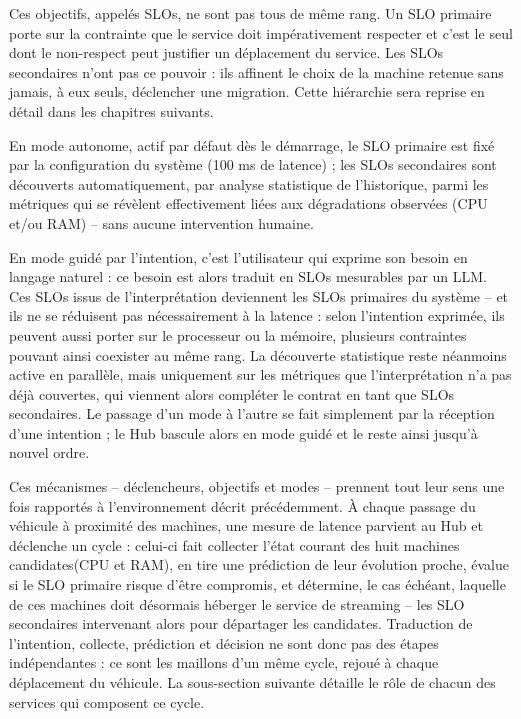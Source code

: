 Ces objectifs, appelés SLOs, ne sont pas tous de même rang. Un SLO primaire porte sur la contrainte que le service doit impérativement respecter et c'est le seul dont le non-respect peut justifier un déplacement du service. Les SLOs secondaires n'ont pas ce pouvoir : ils affinent le choix de la machine retenue sans jamais, à eux seuls, déclencher une migration. Cette hiérarchie sera reprise en détail dans les chapitres suivants.

En mode autonome, actif par défaut dès le démarrage, le SLO primaire est fixé par la configuration du système (100 ms de latence) ; les SLOs secondaires sont découverts automatiquement, par analyse statistique de l'historique, parmi les métriques qui se révèlent effectivement liées aux dégradations observées (CPU et/ou RAM) -- sans aucune intervention humaine.

En mode guidé par l'intention, c'est l'utilisateur qui exprime son besoin en langage naturel : ce besoin est alors traduit en SLOs mesurables par un LLM. Ces SLOs issus de l'interprétation deviennent les SLOs primaires du système -- et ils ne se réduisent pas nécessairement à la latence : selon l'intention exprimée, ils peuvent aussi porter sur le processeur ou la mémoire, plusieurs contraintes pouvant ainsi coexister au même rang. La découverte statistique reste néanmoins active en parallèle, mais uniquement sur les métriques que l'interprétation n'a pas déjà couvertes, qui viennent alors compléter le contrat en tant que SLOs secondaires. Le passage d'un mode à l'autre se fait simplement par la réception d'une intention ; le Hub bascule alors en mode guidé et le reste ainsi jusqu'à nouvel ordre.

Ces mécanismes -- déclencheurs, objectifs et modes -- prennent tout leur sens une fois rapportés à l'environnement décrit précédemment. À chaque passage du véhicule à proximité des machines, une mesure de latence parvient au Hub et déclenche un cycle : celui-ci fait collecter l'état courant des huit machines candidates(CPU et RAM), en tire une prédiction de leur évolution proche, évalue si le SLO primaire risque d'être compromis, et détermine, le cas échéant, laquelle de ces machines doit désormais héberger le service de streaming -- les SLO secondaires intervenant alors pour départager les candidates. Traduction de l'intention, collecte, prédiction et décision ne sont donc pas des étapes indépendantes : ce sont les maillons d'un même cycle, rejoué à chaque déplacement du véhicule. La sous-section suivante détaille le rôle de chacun des services qui composent ce cycle.

